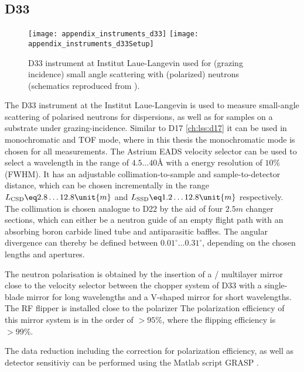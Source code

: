\documentclass[\main/dresen_thesis.tex]{subfiles}
\begin{document}
  \subsection{D33}\label{ch:lss:d33}
    \begin{figure}[ht]
      \centering
      \texttt{[image: appendix\_instruments\_d33]}
      \texttt{[image: appendix\_instruments\_d33Setup]}
      \caption{\label{fig:lss:d33}D33 instrument at Institut Laue-Langevin used for (grazing incidence) small angle scattering with (polarized) neutrons (schematics reproduced from \cite{Dewhurst_2015_Thesm}).}
    \end{figure}
    The D33 instrument \cite{Dewhurst_2015_Thesm} at the Institut Laue-Langevin is used to measure small-angle scattering of polarised neutrons for dispersions, as well as for samples on a substrate under grazing-incidence.
    Similar to D17 \ref{ch:lss:d17} it can be used in monochromatic and TOF mode, where in this thesis the monochromatic mode is chosen for all measurements.
    The Astrium EADS velocity selector can be used to select a wavelength in the range of $4.5 \ldots 40 \unit{\angstrom}$ with a energy resolution of $10 \unit{\%}$ (FWHM).
    It has an adjustable collimation-to-sample and sample-to-detector distance, which can be chosen incrementally in the range $L_\mathrm{CSD} \eq 2.8 \ldots 12.8 \unit{m}$ and $L_\mathrm{SSD} \eq 1.2 \ldots 12.8 \unit{m}$ respectively.
    The collimation is chosen analogue to D22 by the aid of four $2.5 \unit{m}$ changer sections, which can either be a neutron guide of an empty flight path with an absorbing boron carbide lined tube and antiparasitic baffles.
    The angular divergence can thereby be defined between $0.01^\circ \ldots 0.31^\circ$, depending on the chosen lengths and apertures.

    The neutron polarisation is obtained by the insertion of a / multilayer mirror close to the velocity selector between the chopper system of D33 with a single-blade mirror for long wavelengths and a V-shaped mirror for short wavelengths.
    The RF flipper is installed close to the polarizer 
    The polarization efficiency of this mirror system is in the order of $>95 \unit{\%}$, where the flipping efficiency is $>99 \unit{\%}$.

    The data reduction including the correction for polarization efficiency, as well as detector sensitiviy can be performed using the Matlab script GRASP \cite{Dewhurst_2003_Grasp}.
\end{document}
